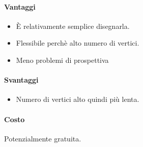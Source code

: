\documentclass[8pt]{extarticle}
\begin{document}
\begin{multicols}{3}
\paragraph{Vantaggi}
\begin{itemize}
    \item È relativamente semplice disegnarla.
    \item Flessibile perchè alto numero di vertici.
    \item Meno problemi di prospettiva 
\end{itemize}
\paragraph{Svantaggi}
\begin{itemize}
    \item Numero di vertici alto quindi più lenta.
\end{itemize}
\paragraph{Costo} Potenzialmente gratuita.








\end{multicols}
\end{document}
